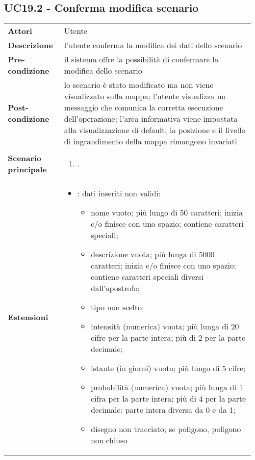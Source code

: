 \subsection{UC19.2 - Conferma modifica scenario} 
\label{sssec:UC19.2} 
\def\arraystretch{1.5}
\begin{tabularx}{\textwidth}{l|p{}}
	\rowcolor{I} \multicolumn{2}{c}{\color{white}\textbf{UC19.2 - Conferma modifica scenario}} \\
	\toprule
	\endhead
	\textbf{Attori} & Utente\\
	\textbf{Descrizione} & l'utente conferma la modifica dei dati dello scenario\\
	\textbf{Pre-condizione} & il sistema offre la possibilità di confermare la modifica dello scenario\\
	\textbf{Post-condizione} & lo scenario è stato modificato ma non viene visualizzato sulla mappa; l'utente visualizza un messaggio che comunica la corretta esecuzione dell'operazione; l'area informativa viene impostata alla visualizzazione di default; la posizione e il livello di ingrandimento della mappa rimangono invariati\\
	\textbf{Scenario principale} & \vspace{-1.2em}\begin{enumerate}[leftmargin=*,noitemsep,nosep]
		\item \nameref{sssec:UC19.2}.
	\end{enumerate}\\
	\textbf{Estensioni} & \vspace{-1.2em}\begin{itemize}[leftmargin=*,noitemsep,nosep]
		\item \nameref{sssec:UC19.3}: dati inseriti non validi:
		\begin{itemize}
			\item nome vuoto; più lungo di 50 caratteri; inizia e/o
			finisce con uno spazio; contiene caratteri speciali;
			\item descrizione vuota; più lunga di 5000 caratteri;
			inizia e/o finisce con uno spazio; contiene
			caratteri speciali diversi dall'apostrofo;
			\item tipo non scelto;
			\item intensità (numerica) vuota; più lunga di 20 cifre per la
			parte intera; più di 2 per la parte decimale;
			\item istante (in giorni) vuoto; più lungo di 5 cifre;
			\item probabilità (numerica) vuota; più lunga di 1 cifra per la
			parte intera; più di 4 per la parte decimale; parte
			intera diversa da 0 e da 1;
			\item disegno non tracciato; se poligono, poligono non
			chiuso
		\end{itemize}
	\end{itemize}\\
	\bottomrule
\end{tabularx}
